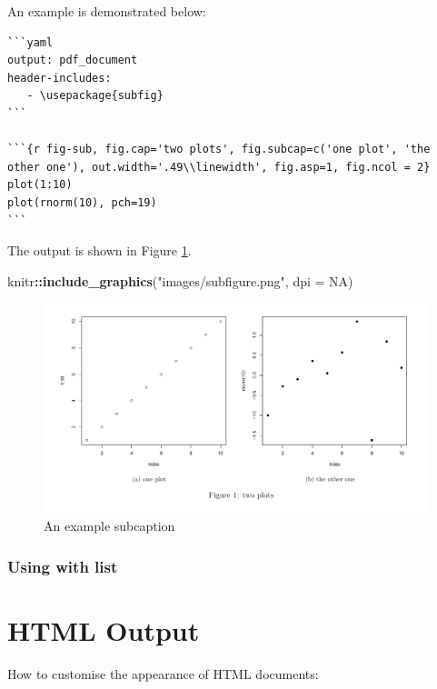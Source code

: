 \documentclass[]{book}
\newenvironment{Shaded}{\begin{snugshade}}{\end{snugshade}}
\newcommand{\KeywordTok}[1]{\textcolor[rgb]{0.13,0.29,0.53}{\textbf{#1}}}
\newcommand{\DataTypeTok}[1]{\textcolor[rgb]{0.13,0.29,0.53}{#1}}
\newcommand{\StringTok}[1]{\textcolor[rgb]{0.31,0.60,0.02}{#1}}
\newcommand{\OtherTok}[1]{\textcolor[rgb]{0.56,0.35,0.01}{#1}}
\newcommand{\OperatorTok}[1]{\textcolor[rgb]{0.81,0.36,0.00}{\textbf{#1}}}
\newcommand{\NormalTok}[1]{#1}
\begin{document}
An example is demonstrated below:

\begin{verbatim}
```yaml
output: pdf_document
header-includes:
   - \usepackage{subfig}
```

```{r fig-sub, fig.cap='two plots', fig.subcap=c('one plot', 'the other one'), out.width='.49\\linewidth', fig.asp=1, fig.ncol = 2}
plot(1:10)
plot(rnorm(10), pch=19)
```
\end{verbatim}

The output is shown in Figure \ref{fig:subcaptions}.

\begin{Shaded}
\begin{Highlighting}[]
\NormalTok{knitr}\OperatorTok{::}\KeywordTok{include_graphics}\NormalTok{(}\StringTok{"images/subfigure.png"}\NormalTok{, }\DataTypeTok{dpi =} \OtherTok{NA}\NormalTok{)}
\end{Highlighting}
\end{Shaded}

\begin{figure}
\centering
\includegraphics{images/subfigure.png}
\caption{\label{fig:subcaptions}An example subcaption}
\end{figure}

\subsection{Using with list}\label{using-with-list}

\chapter{HTML Output}\label{html-output}

How to customise the appearance of HTML documents:
\end{document}
